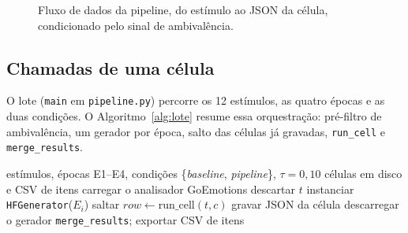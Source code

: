 \begin{figure}[ht]
\centering
{}
\caption{Fluxo de dados da pipeline, do estímulo ao JSON da célula, condicionado pelo sinal de ambivalência.}
\label{fig:pipeline_fluxo}
\end{figure}

\subsection{Chamadas de uma célula}
\label{subsec:impl_chamadas}

O lote (\texttt{main} em \texttt{pipeline.py}) percorre os 12 estímulos, as quatro épocas e as duas condições. O Algoritmo~\ref{alg:lote} resume essa orquestração: pré-filtro de ambivalência, um gerador por época, salto das células já gravadas, \texttt{run\_cell} e \texttt{merge\_results}.

\begin{algorithm}[H]
\caption{Geração do lote (\texttt{main} em \texttt{pipeline.py}).}
\label{alg:lote}
\begin{algorithmic}[1]
\Require estímulos, épocas E1--E4, condições \{\textit{baseline}, \textit{pipeline}\}, \(\tau=0{,}10\)
\Ensure células em disco e CSV de itens
\State carregar o analisador GoEmotions
    \State descartar \(t\)
  \EndIf
\EndFor
{}
  \State instanciar \texttt{HFGenerator}(\(E_i\))
      \State saltar
    \Else
      \State \(\textit{row} \gets \mathrm{run\_cell}(t, c)\)
      \State gravar JSON da célula
    \EndIf
  \EndFor
  \State descarregar o gerador
\EndFor
\State \texttt{merge\_results}; exportar CSV de itens
\end{algorithmic}
\end{algorithm}


